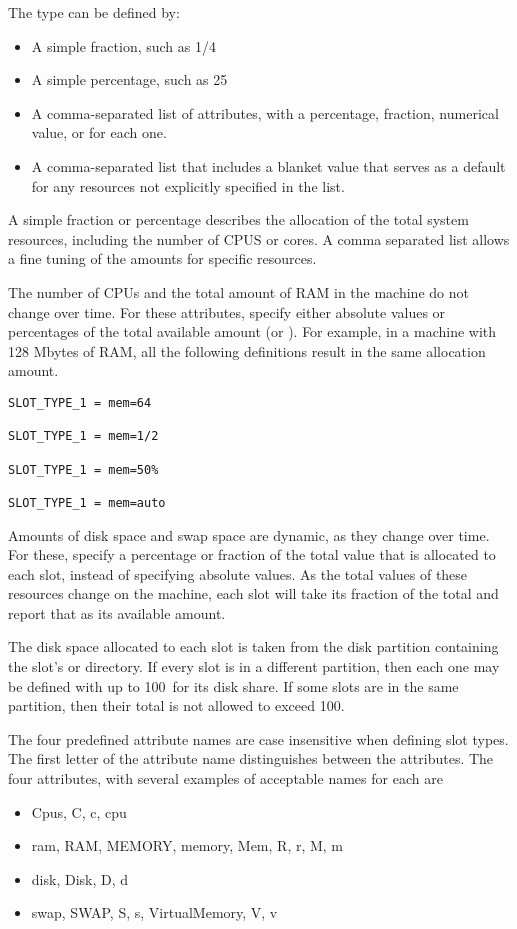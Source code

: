 \begin{description}
The type can be defined by:
\begin{itemize}
  \item A simple fraction, such as 1/4
  \item A simple percentage, such as 25\Percent
  \item A comma-separated list of attributes, with a percentage,
	fraction, numerical value, or  for each one.
  \item A comma-separated list that includes a blanket value that serves
        as a default for any resources not explicitly specified in the list.
\end{itemize}
A simple fraction or percentage describes the allocation
of the total system resources,
including the number of CPUS or cores.
A comma separated list allows a fine tuning of
the amounts for specific resources.

The number of CPUs
and the total amount of RAM in
the machine do not change over time.
For these attributes, specify either absolute values or
percentages of the total available amount (or ).  
For example, in a machine with 128 Mbytes of RAM,
all the following definitions result in the same allocation amount.
\begin{verbatim}
SLOT_TYPE_1 = mem=64

SLOT_TYPE_1 = mem=1/2

SLOT_TYPE_1 = mem=50%

SLOT_TYPE_1 = mem=auto
\end{verbatim}

Amounts of disk space and swap space are dynamic, as they change over time.
For these, specify a percentage or fraction of the total
value that is allocated to each slot, instead of specifying absolute values.
As the total values of these resources change on the machine, each
slot will take its fraction of the total and report that as its
available amount.

The disk space allocated to each slot is taken from the disk partition
containing the slot's  or  directory.
If every slot is in a different partition, 
then each one may be defined with up to
100\Percent\ for its disk share.  If some slots are in the same
partition, then their total is not allowed to exceed 100\Percent.

The four predefined attribute names are case insensitive when defining slot types.
The first letter of the attribute name distinguishes between
the attributes.
The four attributes, with several examples of acceptable names for
each are
\begin{itemize}
  \item Cpus, C, c, cpu 
  \item ram, RAM, MEMORY, memory, Mem, R, r, M, m
  \item disk, Disk, D, d
  \item swap, SWAP, S, s, VirtualMemory, V, v
\end{itemize}


\end{description}
